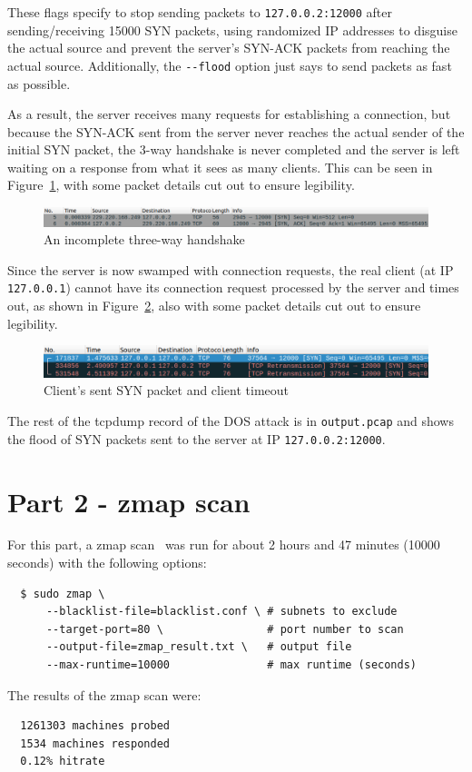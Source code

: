 \documentclass[11pt]{article}
\begin{document}
These flags specify to stop sending packets to \verb|127.0.0.2:12000| after sending/receiving 15000
SYN packets, using randomized IP addresses to disguise the actual source and prevent the
server's SYN-ACK packets from reaching the actual source. Additionally, the \verb|--flood|
option just says to send packets as fast as possible.

As a result, the server receives many requests for establishing a connection, but because the
SYN-ACK sent from the server never reaches the actual sender of the initial SYN packet, the
3-way handshake is never completed and the server is left waiting on a response from what it
sees as many clients. This can be seen in Figure~\ref{fig:handshake}, with some packet details
cut out to ensure legibility.
\begin{figure}[htbp]
  \centering
  \includegraphics[width=1\linewidth]{./incomplete_handshake.png}
  \caption{\label{fig:handshake}
  An incomplete three-way handshake}
\end{figure}

Since the server is now swamped with connection requests, the real client (at IP \verb|127.0.0.1|)
cannot have its connection request processed by the server and times out, as shown in
Figure~\ref{fig:timeout}, also with some packet details cut out to ensure legibility.
\begin{figure}[htbp]
  \centering
  \includegraphics[width=1\linewidth]{./client_timeout.png}
  \caption{\label{fig:timeout}
  Client's sent SYN packet and client timeout}
\end{figure}

The rest of the tcpdump record of the DOS attack is in \verb|output.pcap| and shows the flood
of SYN packets sent to the server at IP \verb|127.0.0.2:12000|.
\section*{Part 2 - zmap scan}
For this part, a zmap scan~\cite{zmap} was run for about 2 hours and 47 minutes (10000 seconds) with the
following options:
\begin{verbatim}
  $ sudo zmap \
      --blacklist-file=blacklist.conf \ # subnets to exclude
      --target-port=80 \                # port number to scan
      --output-file=zmap_result.txt \   # output file
      --max-runtime=10000               # max runtime (seconds)
\end{verbatim}
The results of the zmap scan were:
\begin{verbatim}
  1261303 machines probed
  1534 machines responded
  0.12% hitrate
\end{verbatim}
\end{document}
